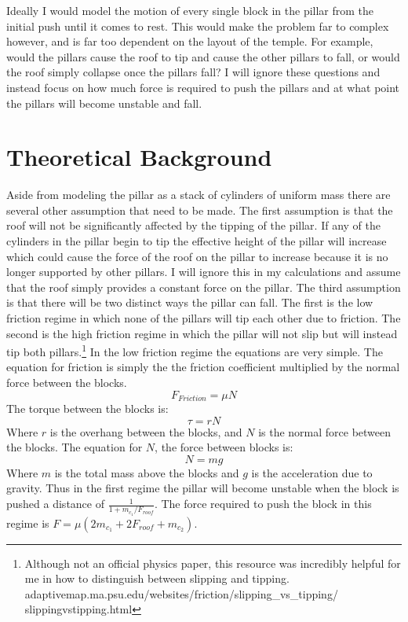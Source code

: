 \documentclass[two column]{article}
\begin{document}
Ideally I would model the motion of every single block in the pillar from the initial push until it comes to rest. This would make the problem far to complex however, and is far too dependent on the layout of the temple. For example, would the pillars cause the roof to tip and cause the other pillars to fall, or would the roof simply collapse once the pillars fall? I will ignore these questions and instead focus on how much force is required to push the pillars and at what point the pillars will become unstable and fall. 

\section{Theoretical Background}
Aside from modeling the pillar as a stack of cylinders of uniform mass there are several other assumption that need to be made. The first assumption is that the roof will not be significantly affected by the tipping of the pillar. If any of the cylinders in the pillar begin to tip the effective height of the pillar will increase which could cause the force of the roof on the pillar to increase because it is no longer supported by other pillars. I will ignore this in my calculations and assume that the roof simply provides a constant force on the pillar. The third assumption is that there will be two distinct ways the pillar can fall. The first is the low friction regime in which none of the pillars will tip each other due to friction. The second is the high friction regime in which the pillar will not slip but will instead tip both pillars.\footnote{Although not an official physics paper, this resource was incredibly helpful for me in how to distinguish between slipping and tipping. adaptivemap.ma.psu.edu/websites/friction/slipping\_vs\_tipping/ slippingvstipping.html}
In the low friction regime the equations are very simple. The equation for friction is simply the the friction coefficient multiplied by the normal force between the blocks.
$$F_{Friction}=\mu N$$
The torque between the blocks is:
$$\tau=rN$$
Where $r$ is the overhang between the blocks, and $N$ is the normal force between the blocks. The equation for $N$, the force between blocks is:
$$N=mg$$
Where $m$ is the total mass above the blocks and $g$ is the acceleration due to gravity. Thus in the first regime the pillar will become unstable when the block is pushed a distance of $\frac{1}{1+m_{c_1}/F_{roof}}$. The force required to push the block in this regime is $F=\mu(2m_{c_1}+2F_{roof}+m_{c_2})$.
\end{document}
